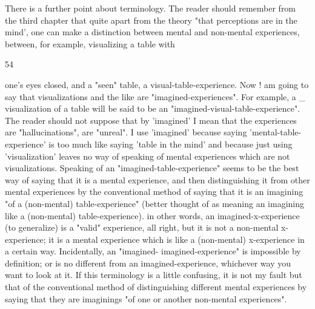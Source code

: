 \documentclass[10pt,twoside]{memoir}
\begin{document}
\begin{enumerate}
{{{{{{{{{{{{{{{There is a further point about terminology. The reader should 
remember from the third chapter that quite apart from the theory "that 
perceptions are in the mind', one can make a distinction between mental 
and non-mental experiences, between, for example, visualizing a table with 


54 


one's eyes closed, and a "seen" table, a visual-table-experience. Now ! am 
going to say that visualizations and the like are "imagined-experiences". For 
example, a _ visualization of a table will be said to be an 
"imagined-visual-table-experience". The reader should not suppose that by 
'imagined' I mean that the experiences are "hallucinations", are "unreal". I 
use 'imagined' because saying 'mental-table-experience' is too much like 
saying 'table in the mind' and because just using 'visualization' leaves no way 
of speaking of mental experiences which are not visualizations. Speaking of 
an "imagined-table-experience" seems to be the best way of saying that it is 
a mental experience, and then distinguishing it from other mental 
experiences by the conventional method of saying that it is an imagining "of 
a (non-mental) table-experience" (better thought of as meaning an imagining 
like a  (non-mental)  table-experience). in other words, an 
imagined-x-experience (to generalize) is a "valid" experience, all right, but it 
is not a non-mental x-experience; it is a mental experience which is like a 
(non-mental) x-experience in a certain way. Incidentally, an "imagined- 
imagined-experience" is impossible by definition; or is no different from an 
imagined-experience, whichever way you want to look at it. If this 
terminology is a little confusing, it is not my fault but that of the 
conventional method of distinguishing different mental experiences by 
saying that they are imaginings "of one or another non-mental experiences". 

}}}}}}}}}}}}}}}
\end{enumerate}
\end{document}
